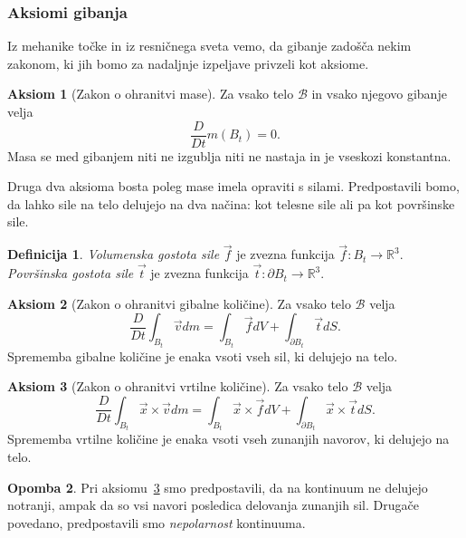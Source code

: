 \documentclass[12pt,a4paper]{article}
\theoremstyle{definition} %
\newtheorem{definicija}{Definicija}[section]
\newtheorem{opomba}[definicija]{Opomba}
\newtheorem{aksiom}{Aksiom}
\theoremstyle{plain} %
\numberwithin{equation}{section}
\newcommand{\R}{\mathbb R}
\newcommand{\B}{\mathcal{B}}
\newcommand{\DD}[2]{\ensuremath{\frac{D #1}{D #2}}}
\newcommand{\DDt}[1]{\DD{#1}{t}}
\newcommand{\vv}{\vec{v}}
\newcommand{\vt}{\vec{t}}
\newcommand{\vf}{\vec{f}}
\newcommand{\vx}{\vec{x}}
\begin{document}
\subsubsection{Aksiomi gibanja}
Iz mehanike točke in iz resničnega sveta vemo, da gibanje zadošča nekim
zakonom, ki jih bomo za nadaljnje izpeljave privzeli kot aksiome.

\begin{aksiom}[Zakon o ohranitvi mase]
  \label{aks:masa}
  Za vsako telo $\B$ in vsako njegovo gibanje velja
  \begin{equation}
    \DDt{}m(B_t) = 0.
    \label{eq:masa}
  \end{equation}
  Masa se med gibanjem niti ne izgublja niti ne nastaja in je vseskozi
  konstantna.
\end{aksiom}

Druga dva aksioma bosta poleg mase imela opraviti s silami. Predpostavili bomo,
da lahko sile na telo delujejo na dva načina: kot telesne sile ali pa kot
površinske sile.

\begin{definicija}
  \emph{Volumenska gostota sile} $\vf$ je zvezna funkcija $\vf\colon B_t\to\R^3$.
  \emph{Površinska gostota sile} $\vt$ je zvezna funkcija $\vt\colon\partial B_t\to\R^3$.
\end{definicija}

\begin{aksiom}[Zakon o ohranitvi gibalne količine]
  \label{aks:gib}
  Za vsako telo $\B$ velja
  \begin{equation}
    \DDt{}\int_{B_t} \vv dm = \int_{B_t} \vf dV + \int_{\partial B_t} \vec t dS.
    \label{eq:gib}
  \end{equation}
  Sprememba gibalne količine je enaka vsoti vseh sil, ki delujejo na telo.
\end{aksiom}

\begin{aksiom}[Zakon o ohranitvi vrtilne količine]
  \label{aks:vrt}
  Za vsako telo $\B$ velja
  \begin{equation}
    \DDt{}\int_{B_t}\vx \times \vv dm = \int_{B_t} \vx \times \vf dV +
    \int_{\partial B_t} \vx\times\vt dS.
    \label{eq:vrt}
  \end{equation}
  Sprememba vrtilne količine je enaka vsoti vseh zunanjih navorov, ki delujejo
  na telo.
\end{aksiom}
\begin{opomba}
  Pri aksiomu~\ref{aks:vrt} smo predpostavili, da na kontinuum ne delujejo
  notranji, ampak da so vsi navori posledica delovanja zunanjih sil. Drugače
  povedano, predpostavili smo \emph{nepolarnost} kontinuuma.
\end{opomba}
\end{document}
